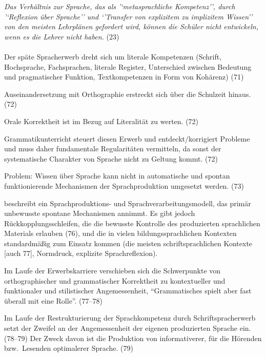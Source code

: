\textit{Das Verhältnis zur Sprache, das als '`metasprachliche Kompetenz'', durch '`Reflexion über Sprache'' und `'Transfer von explizitem zu implizitem Wissen'' von den meisten Lehrplänen gefordert wird, können die Schüler nicht entwickeln, wenn es die Lehrer nicht haben.} (23)


\paragraph{\citet{Portmanntselikas2011}}

Der späte Spracherwerb dreht sich um literale Kompetenzen (Schrift, Hochsprache, Fachsprachen, literale Register, Unterschied zwischen Bedeutung und pragmatischer Funktion, Textkompetenzen \zB in Form von Kohärenz) (71)

Auseinandersetzung mit Orthographie erstreckt sich über die Schulzeit hinaus. (72)

Orale Korrektheit ist im Bezug auf Literalität zu werten. (72)

Grammatikunterricht steuert diesen Erwerb und entdeckt/korrigiert Probleme und muss daher fundamentale Regularitäten vermitteln, da sonst der systematische Charakter von Sprache nicht zu Geltung kommt. (72)

Problem: Wissen über Sprache kann nicht in automatische und spontan funktionierende Mechanismen der Sprachproduktion umgesetzt werden. (73)

\citet[75--79]{Portmanntselikas2011} beschreibt ein Sprachproduktions- und Sprachverarbeitungsmodell, das primär unbewusste spontane Mechanismen annimmt.
Es gibt jedoch Rückkopplungsschleifen, die die bewusste Kontrolle des produzierten sprachlichen Materials erlauben (76), und die in vielen bildungssprachlichen Kontexten standardmäßig zum Einsatz kommen (die meisten schriftsprachlichen Kontexte [auch 77], Normdruck, explizite Sprachreflexion).

Im Laufe der Erwerbskarriere verschieben sich die Schwerpunkte von orthographischer und grammatischer Korrektheit zu kontextueller und funktionaler und stilistischer Angemessenheit, "`Grammatisches spielt aber fast überall mit eine Rolle"'. (77--78)

Im Laufe der Restrukturierung der Sprachkompetenz durch Schriftspracherwerb setzt der Zweifel an der Angemessenheit der eigenen produzierten Sprache ein. (78--79)
Der Zweck davon ist die Produktion von informativerer, für die Hörenden bzw.\ Lesenden optimalerer Sprache. (79)

